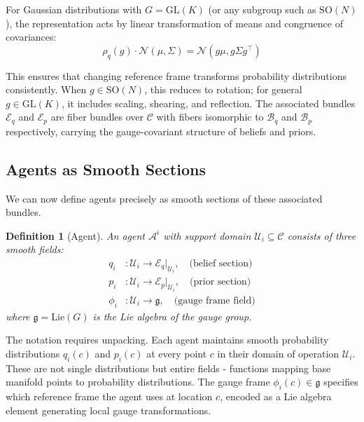 \documentclass[11pt]{article}
\newtheorem{definition}{Definition}
\begin{document}
For Gaussian distributions with $G = \mathrm{GL}(K)$ (or any subgroup such as $\mathrm{SO}(N)$), the representation acts by linear transformation of means and congruence of covariances:
\begin{equation}
\rho_q(g) \cdot \mathcal{N}(\mu, \Sigma) = \mathcal{N}(g\mu, g\Sigma g^\top)
\end{equation}

This ensures that changing reference frame transforms probability distributions consistently. When $g \in \mathrm{SO}(N)$, this reduces to rotation; for general $g \in \mathrm{GL}(K)$, it includes scaling, shearing, and reflection. The associated bundles $\mathcal{E}_q$ and $\mathcal{E}_p$ are fiber bundles over $\mathcal{C}$ with fibers isomorphic to $\mathcal{B}_q$ and $\mathcal{B}_p$ respectively, carrying the gauge-covariant structure of beliefs and priors.

\subsection{Agents as Smooth Sections}

We can now define agents precisely as smooth sections of these associated bundles.

\begin{definition}[Agent]
An agent $\mathcal{A}^i$ with support domain $\mathcal{U}_i \subseteq \mathcal{C}$ consists of three smooth fields:
\begin{align}
q_i &: \mathcal{U}_i \to \mathcal{E}_q|_{\mathcal{U}_i}, \quad \text{(belief section)} \\
p_i &: \mathcal{U}_i \to \mathcal{E}_p|_{\mathcal{U}_i}, \quad \text{(prior section)} \\
\phi_i &: \mathcal{U}_i \to \mathfrak{g}, \quad \text{(gauge frame field)}
\end{align}
where $\mathfrak{g} = \mathrm{Lie}(G)$ is the Lie algebra of the gauge group.
\end{definition}

The notation requires unpacking. Each agent maintains smooth probability distributions $q_i(c)$ and $p_i(c)$ at every point $c$ in their domain of operation $\mathcal{U}_i$. These are not single distributions but entire fields - functions mapping base manifold points to probability distributions. The gauge frame $\phi_i(c) \in \mathfrak{g}$ specifies which reference frame the agent uses at location $c$, encoded as a Lie algebra element generating local gauge transformations.
\end{document}

